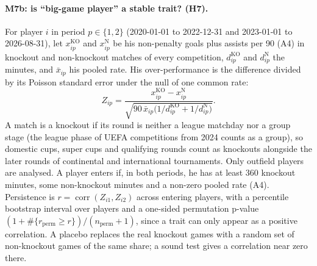 \documentclass[11pt,a4paper]{article}
\DeclareMathOperator{\corr}{corr}
\begin{document}
\paragraph{M7b: is ``big-game player'' a stable trait? (H7).}
For player $i$ in period $p \in \{1, 2\}$ (2020-01-01 to 2022-12-31 and
2023-01-01 to 2026-08-31), let $x^{\mathrm{KO}}_{ip}$ and $x^{\mathrm{N}}_{ip}$ be
his non-penalty goals plus assists per 90 (A4) in knockout and non-knockout
matches of every competition, $d^{\mathrm{KO}}_{ip}$ and $d^{\mathrm{N}}_{ip}$
the minutes, and
$\bar x_{ip}$ his pooled rate. His over-performance is the difference divided by
its Poisson standard error under the null of one common rate:
\begin{equation}
  Z_{ip} = \frac{x^{\mathrm{KO}}_{ip} - x^{\mathrm N}_{ip}}
  {\sqrt{90\, \bar x_{ip}\big(1/d^{\mathrm{KO}}_{ip} + 1/d^{\mathrm N}_{ip}\big)}} .
  \label{eq:overperf}
\end{equation}
A match is a knockout if its round is neither a league matchday nor a group
stage (the league phase of UEFA competitions from 2024 counts as a group), so
domestic cups, super cups and qualifying rounds count as knockouts alongside
the later rounds of continental and international tournaments. Only outfield
players are analysed. A player enters if, in both periods, he has at least 360
knockout minutes, some non-knockout minutes and a non-zero pooled rate (A4).
Persistence is
$r = \corr(Z_{i1}, Z_{i2})$ across entering players, with a percentile
bootstrap interval over players and a one-sided permutation p-value
$(1 + \#\{r_{\text{perm}} \ge r\}) / (n_{\text{perm}} + 1)$, since a trait can only
appear as a positive correlation. A placebo replaces the real knockout games
with a random set of non-knockout games of the same share; a sound test gives
a correlation near zero there.
\end{document}

